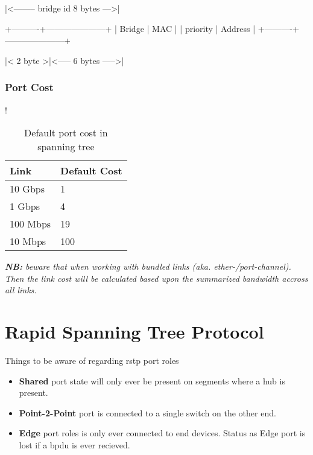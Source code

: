 \begin{txt}
    |<-------- bridge id 8 bytes --->|
    
    +----------+---------------------+
    | Bridge   |        MAC          |
    | priority |       Address       |
    +----------+---------------------+
    
    |< 2 byte >|<----- 6 bytes ----->|
\end{txt}

\subsubsection{Port Cost}

\begin{table}[h]
    \centering
    \caption{Default port cost in spanning tree}
    \label{stpportcost}{!}{%
        \begin{tabular}{|l|l|}
            \hline
            \textbf{Link} & \textbf{Default Cost} \\ \hline
            10 Gbps & 1 \\ \hline
            1 Gbps & 4 \\ \hline
            100 Mbps & 19 \\ \hline
            10 Mbps & 100 \\ \hline
        \end{tabular}%
    }
\end{table}


\textit{\textbf{NB:} beware that when working with bundled links (aka. ether-/port-channel). Then the link cost will be calculated based upon the summarized bandwidth accross all links.}


\section{Rapid Spanning Tree Protocol}



Things to be aware of regarding \gls{rstp} port roles
\begin{itemize}
    \item \textbf{Shared} port state will only ever be present on segments where a hub is present.
    \item \textbf{Point-2-Point} port is connected to a single switch on the other end.
    \item \textbf{Edge} port roles is only ever connected to end devices. Status as Edge port is lost if a \gls{bpdu} is ever recieved.
\end{itemize}

